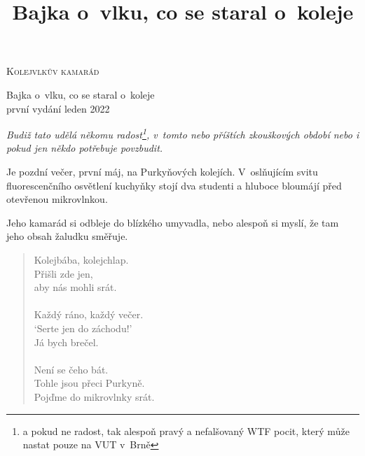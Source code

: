 \documentclass[a5paper, twoside,12pt]{book}
\title{Bajka o~vlku, co se staral o~koleje}
\begin{document}
\begin{titlepage}
    \begin{center}
        {\Large \textsc{Kolejvlkův kamarád}}

        {\LARGE Bajka o~vlku, co se staral o~koleje}\\
        {\large první vydání} \hfill {\large leden 2022}
        \end{center}
\end{titlepage}

\thispagestyle{empty}
\vspace*{\fill}
\emph{Budiž tato  udělá někomu radost\footnote[2]{a pokud ne radost, tak alespoň pravý a nefalšovaný WTF pocit, který může nastat pouze na VUT v~Brně}, v~tomto nebo příštích zkouškových období nebo i pokud jen někdo potřebuje povzbudit.}\\
\vspace*{\fill}

\restoregeometry
\setcounter{page}{1}
Je pozdní večer, první máj, na Purkyňových kolejích. V~oslňujícím svitu fluorescenčního osvětlení kuchyňky stojí dva studenti a hluboce bloumájí před otevřenou mikrovlnkou.



Jeho kamarád si odbleje do blízkého umyvadla, nebo alespoň si myslí, že tam jeho obsah žaludku směřuje.

\begin{verse}
Kolejbába, kolejchlap.\\
Přišli zde jen,\\
aby nás mohli srát.\\
\ \\
Každý ráno, každý večer.\\
`Serte jen do záchodu!'\\
Já bych brečel.\\
\ \\
Není se čeho bát.\\
Tohle jsou přeci Purkyně.\\
Pojďme do mikrovlnky srát.\\
\end{verse}
\end{document}
